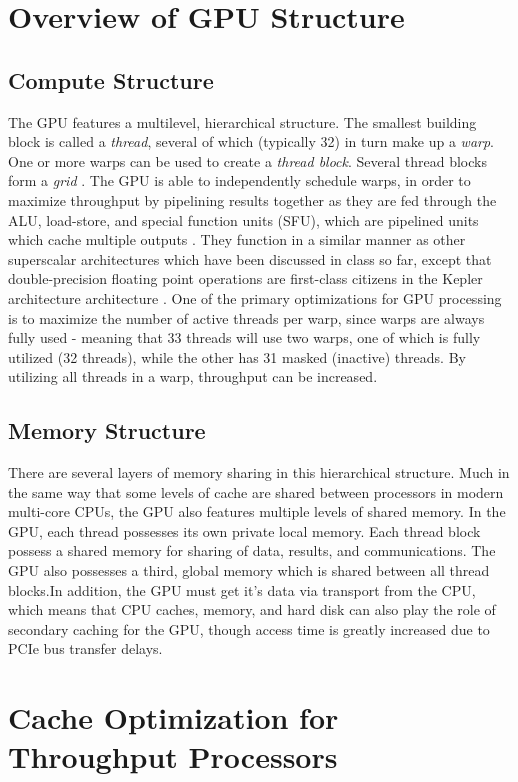 \documentclass[conference]{IEEEtran}
\begin{document}
\section{Overview of GPU Structure}
\subsection{Compute Structure}
The GPU features a multilevel, hierarchical structure. 
The smallest building block is called a \emph{thread}, several of which 
(typically 32) in turn make up a \emph{warp}. One or more warps can be used to
create a \emph{thread block}. Several thread blocks form a \emph{grid} 
\cite{cuda}. The GPU is able to independently schedule warps, in order
to maximize throughput by pipelining results together as they are fed
through the ALU, load-store, and special function units (SFU), which are
pipelined units which cache multiple outputs \cite{whitepaper}. 
They function in a similar manner as other superscalar architectures 
which have been discussed in class so far, except that double-precision
floating point operations are first-class citizens in the Kepler architecture
architecture \cite{notes}. One of the primary optimizations for GPU processing
is to maximize the number of active threads per warp, since warps are always
fully used - meaning that 33 threads will use two warps, one of which is 
fully utilized (32 threads), while the other has 31 masked (inactive) threads.
By utilizing all threads in a warp, throughput can be increased.

\subsection{Memory Structure}
There are several layers of memory sharing in this hierarchical structure. Much
in the same way that some levels of cache are shared between processors in
modern multi-core CPUs, the GPU also features multiple levels of shared 
memory. In the GPU, each thread possesses its own private 
local memory. Each thread block possess a shared memory for sharing of data, 
results, and communications. The GPU also possesses a third, global memory 
which is shared between all thread blocks.In addition, the GPU must get it's 
data via transport from the CPU, which means that CPU caches, memory, and hard
disk can also play the role of secondary caching for the GPU, though access
time is greatly increased due to PCIe bus transfer delays.

\section{Cache Optimization for Throughput Processors}
\end{document}
